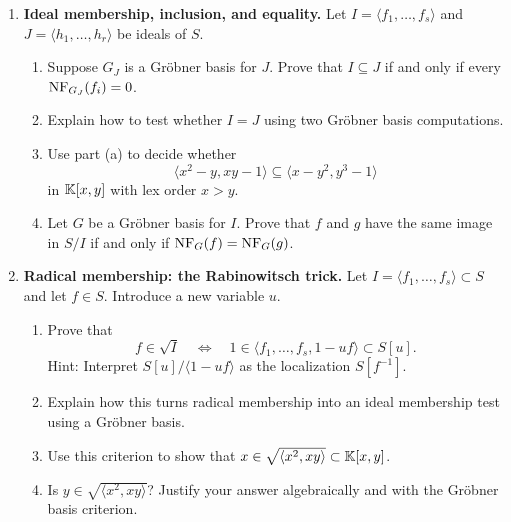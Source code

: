 \documentclass[Notebook.tex]{subfiles}
\begin{document}
\begin{enumerate}[leftmargin=*, resume=problems]
\begin{enumerate}[label=(\alph*),ref=\theenumi\alph*]
    \item Use the Noetherian property of $S$ (or Dickson's Lemma for monomial ideals) to prove that the algorithm terminates.
    
    \item Prove that the output is a Gr\"obner basis for $\langle F\rangle$.
\end{enumerate}


\item \textbf{Ideal membership, inclusion, and equality.} Let $I=\langle f_1,\ldots,f_s\rangle$ and $J=\langle h_1,\ldots,h_r\rangle$ be ideals of $S$.
\begin{enumerate}[label=(\alph*),ref=\theenumi\alph*]
    \item Suppose $G_J$ is a Gr\"obner basis for $J$. Prove that $I\subseteq J$ if and only if every $\text{NF}_{G_J}(f_i)=0$.
    
    \item Explain how to test whether $I=J$ using two Gr\"obner basis computations.
    
    \item Use part (a) to decide whether
    \[
    \langle x^2-y,xy-1\rangle \subseteq \langle x-y^2,y^3-1\rangle
    \]
    in $\mathbb K[x,y]$ with lex order $x>y$.
    
    \item Let $G$ be a Gr\"obner basis for $I$. Prove that $f$ and $g$ have the same image in $S/I$ if and only if $\text{NF}_G(f)=\text{NF}_G(g)$.
\end{enumerate}

\item \textbf{Radical membership: the Rabinowitsch trick.} Let $I=\langle f_1,\ldots,f_s\rangle\subset S$ and let $f\in S$. Introduce a new variable $u$.
\begin{enumerate}[label=(\alph*),ref=\theenumi\alph*]
    \item Prove that
    \[
    f\in \sqrt{I}
    \quad\Longleftrightarrow\quad
    1\in \langle f_1,\ldots,f_s,1-uf\rangle\subset S[u].
    \]
    Hint: Interpret $S[u]/\langle 1-uf\rangle$ as the localization $S[f^{-1}]$.
    
    \item Explain how this turns radical membership into an ideal membership test using a Gr\"obner basis.
    
    \item Use this criterion to show that $x\in \sqrt{\langle x^2,xy\rangle}\subset \mathbb K[x,y]$.
    
    \item Is $y\in \sqrt{\langle x^2,xy\rangle}$? Justify your answer algebraically and with the Gr\"obner basis criterion.
\end{enumerate}


\end{enumerate}
\end{document}
